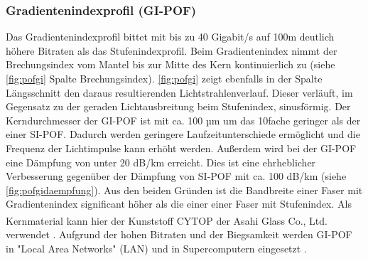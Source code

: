 \subsubsection{Gradientenindexprofil (GI-POF)}

Das Gradientenindexprofil bittet mit bis zu 40 Gigabit/s auf 100m deutlich
höhere Bitraten als das Stufenindexprofil. Beim Gradientenindex nimmt der
Brechungsindex vom Mantel bis zur Mitte des Kern kontinuierlich zu (siehe
\autoref{fig:pofgi} Spalte Brechungsindex). \autoref{fig:pofgi} zeigt ebenfalls
in der Spalte Längsschnitt den daraus resultierenden Lichtstrahlenverlauf.
Dieser verläuft, im Gegensatz zu der geraden Lichtausbreitung beim Stufenindex,
sinusförmig. Der Kerndurchmesser der GI-POF ist mit ca. 100 µm um das 10fache
geringer als der einer SI-POF. Dadurch werden geringere Laufzeitunterschiede
ermöglicht und die Frequenz der Lichtimpulse kann erhöht werden. Außerdem wird
bei der GI-POF eine Dämpfung von unter 20 dB/km erreicht. Dies ist eine
ehrheblicher Verbesserung gegenüber der Dämpfung von SI-POF mit ca. 100 dB/km
(siehe \autoref{fig:pofgidaempfung}). Aus den beiden Gründen ist die Bandbreite
einer Faser mit Gradientenindex significant höher als die einer einer Faser mit
Stufenindex. Als Kernmaterial kann hier der Kunststoff
CYTOP\textsuperscript{\texttrademark} der Asahi Glass Co., Ltd. verwendet
\cite{pofacgif}. Aufgrund der hohen Bitraten und der Biegsamkeit werden GI-POF
in "Local Area Networks" (LAN) und in
Supercomputern eingesetzt \cite{poflee}.

